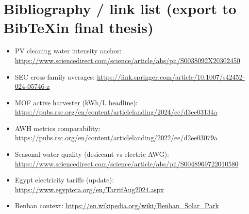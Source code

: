\documentclass[11pt,a4paper]{article}
\begin{document}
\section{Bibliography / link list (export to Bib\TeX in final thesis)}
\begin{itemize}[leftmargin=*]
  \item PV cleaning water intensity anchor: \url{https://www.sciencedirect.com/science/article/abs/pii/S0038092X20302450}
  \item SEC cross-family averages: \url{https://link.springer.com/article/10.1007/s42452-024-05746-z}
  \item MOF active harvester (kWh/L headline): \url{https://pubs.rsc.org/en/content/articlelanding/2024/ee/d3ee03134a}
  \item AWH metrics comparability: \url{https://pubs.rsc.org/en/content/articlelanding/2022/ee/d2ee03079a}
  \item Seasonal water quality (desiccant vs electric AWG): \url{https://www.sciencedirect.com/science/article/abs/pii/S0048969722010580}
  \item Egypt electricity tariffs (update): \url{https://www.egyptera.org/en/TarrifAug2024.aspx}
  \item Benban context: \url{https://en.wikipedia.org/wiki/Benban_Solar_Park}
\end{itemize}
\end{document}
